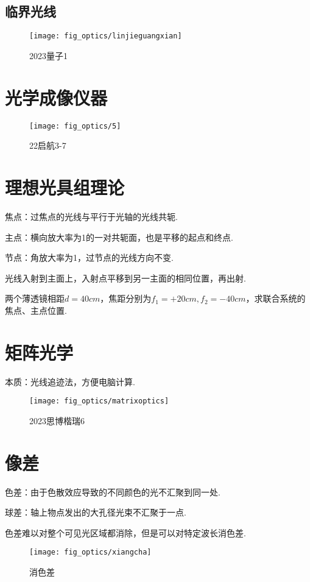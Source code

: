 \documentclass[a4paper]{article}
\begin{document}
	\subsection{临界光线}
	\begin{figure}[H]
		\centering
		\texttt{[image: fig\_optics/linjieguangxian]}
		\caption{2023量子1}
		\label{fig:linjieguangxian}
	\end{figure}
	
	\section{光学成像仪器}
	\begin{figure}[H]
		\centering
		\texttt{[image: fig\_optics/5]}
		\caption{22启航3-7}
		\label{fig:5}
	\end{figure}
	
	\section{理想光具组理论}
	焦点：过焦点的光线与平行于光轴的光线共轭. 
	
	主点：横向放大率为1的一对共轭面，也是平移的起点和终点. 
	
	节点：角放大率为1，过节点的光线方向不变.
	
	光线入射到主面上，入射点平移到另一主面的相同位置，再出射.
	\begin{framed}
		两个薄透镜相距$d=40cm$，焦距分别为$f_1=+20cm, f_2=-40cm$，求联合系统的焦点、主点位置.
	\end{framed}
	
	\section{矩阵光学}
	本质：光线追迹法，方便电脑计算.
	\begin{figure}[H]
		\centering
		\texttt{[image: fig\_optics/matrixoptics]}
		\caption{2023思博楷瑞6}
		\label{fig:matrixoptics}
	\end{figure}
	
	\section{像差}
	色差：由于色散效应导致的不同颜色的光不汇聚到同一处.
	
	球差：轴上物点发出的大孔径光束不汇聚于一点.
	
	色差难以对整个可见光区域都消除，但是可以对特定波长消色差.
	\begin{figure}[H]
		\centering
		\texttt{[image: fig\_optics/xiangcha]}
		\caption{消色差}
		\label{fig:xiangcha}
	\end{figure}
	
\end{document}
